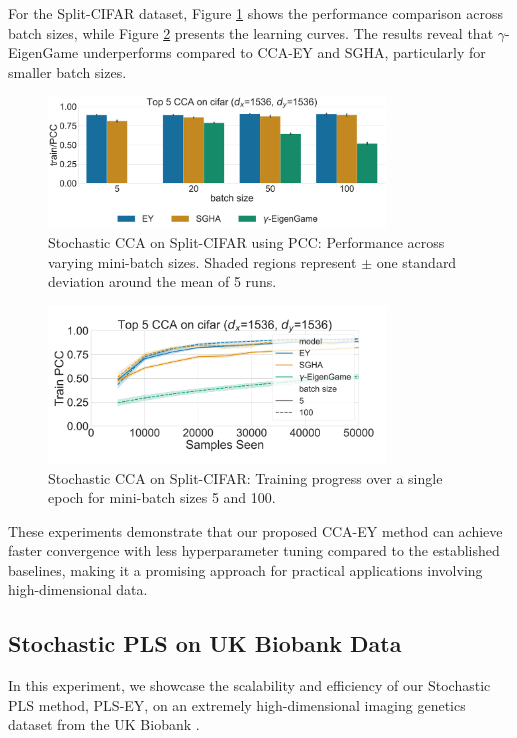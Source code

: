For the Split-CIFAR dataset, Figure \ref{fig:corr_cifar} shows the performance comparison across batch sizes, while Figure \ref{fig:learningcurve_cifar} presents the learning curves. The results reveal that $\gamma$-EigenGame underperforms compared to CCA-EY and SGHA, particularly for smaller batch sizes.
\begin{figure}
\centering
\includegraphics[width=0.8\textwidth]{figures/CCA/cifar_models_different_batch_sizes}
\caption{Stochastic CCA on Split-CIFAR using PCC: Performance across varying mini-batch sizes. Shaded regions represent $\pm$ one standard deviation around the mean of 5 runs.}
\label{fig:corr_cifar}
\end{figure}
\begin{figure}
\centering
\includegraphics[width=0.8\textwidth]{figures/CCA/cifar_allbatchsizes_pcc}
\caption{Stochastic CCA on Split-CIFAR: Training progress over a single epoch for mini-batch sizes 5 and 100.}
\label{fig:learningcurve_cifar}
\end{figure}
These experiments demonstrate that our proposed CCA-EY method can achieve faster convergence with less hyperparameter tuning compared to the established baselines, making it a promising approach for practical applications involving high-dimensional data.

\subsection{Stochastic PLS on UK Biobank Data}
In this experiment, we showcase the scalability and efficiency of our Stochastic PLS method, PLS-EY, on an extremely high-dimensional imaging genetics dataset from the UK Biobank \citep{sudlow2015uk}.
